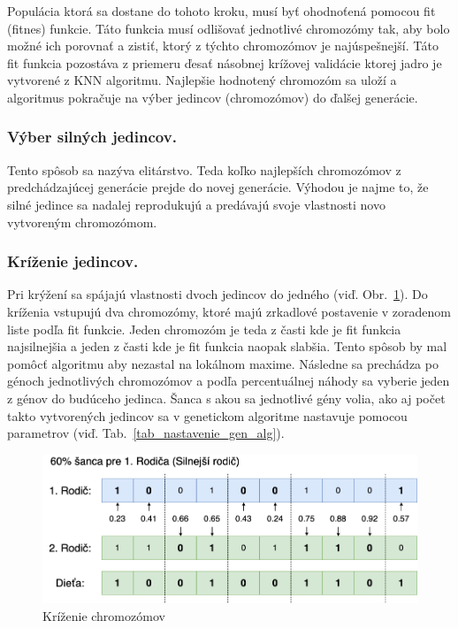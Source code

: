 \documentclass[runningheads]{llncs}
\begin{document}
Populácia ktorá sa dostane do tohoto kroku, musí byť ohodnoťená pomocou fit (fitnes) funkcie. 
Táto funkcia musí odlišovať jednotlivé chromozómy tak, aby bolo možné ich porovnať a zistiť, ktorý
z týchto chromozómov je najúspešnejší. Táto fit funkcia pozostáva z priemeru ďesať násobnej krížovej validácie ktorej jadro
je vytvorené z KNN algoritmu. Najlepšie hodnotený chromozóm sa uloží a algoritmus pokračuje
na výber jedincov (chromozómov) do ďalšej generácie.

\subsubsection{Výber silných jedincov.}

Tento spôsob sa nazýva elitárstvo. Teda koľko najlepších chromozómov z predchádzajúcej generácie prejde
do novej generácie. Výhodou je najme to, že silné jedince sa nadalej reprodukujú a predávajú svoje vlastnosti
novo vytvoreným chromozómom.

\subsubsection{Kríženie jedincov.}

Pri krýžení sa spájajú vlastnosti dvoch jedincov do jedného (viď. Obr.~\ref{fig_ga_krizenie}).
Do kríženia vstupujú dva chromozómy, ktoré majú zrkadlové postavenie v zoradenom liste podľa fit funkcie. 
Jeden chromozóm je teda z časti kde je fit funkcia najsilnejšia a jeden z časti kde je fit funkcia naopak slabšia. 
Tento spôsob by mal pomôcť algoritmu aby nezastal na lokálnom maxime. Následne sa prechádza po génoch 
jednotlivých chromozómov a podľa percentuálnej náhody sa vyberie jeden z génov do budúceho jedinca.
Šanca s akou sa jednotlivé gény volia, ako aj počet takto vytvorených jedincov sa v genetickom algoritme
nastavuje pomocou parametrov (viď. Tab.~\ref{tab_nastavenie_gen_alg}). 

\begin{figure}
\includegraphics[width=\textwidth]{image/krizenie.png}
\caption{Kríženie chromozómov} \label{fig_ga_krizenie}
\end{figure}
\end{document}
